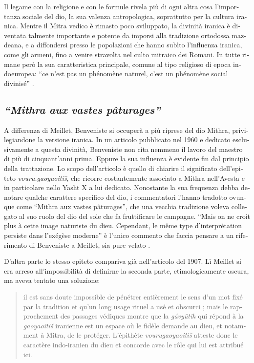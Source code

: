 \documentclass[french,output=paper,colorlinks,citecolor=brown]{../langscibook}
\begin{document}
\begin{otherlanguage}{italian}
Il legame con la religione e con le formule rivela più di ogni altra cosa l’importanza sociale del dio, la sua valenza antropologica, soprattutto per la cultura iranica. Mentre il Mitra vedico è rimasto poco sviluppato, la divinità iranica è diventata talmente importante e potente da imporsi alla tradizione ortodossa mazdeana, e a diffondersi presso le popolazioni che hanno subìto l’influenza iranica, come gli armeni, fino a venire stravolta nel culto mitraico dei Romani. In tutte rimane però la sua caratteristica principale, comune al tipo religioso di epoca indoeuropea: “ce n’est pas un phénomène naturel, c’est un phénomène social divinisé” \citep[159]{Meillet1907}.

\subsection{\textit{“Mithra} \textit{aux} \textit{vastes} \textit{pâturages”}}

A differenza di Meillet, Benveniste si occuperà a più riprese del dio Mithra, privilegiandone la versione iranica. In un articolo pubblicato nel 1960 e dedicato esclusivamente a questa divinità, Benveniste non cita nemmeno il lavoro del maestro di più di cinquant’anni prima. Eppure la sua influenza è evidente fin dal principio della trattazione. Lo scopo dell’articolo è quello di chiarire il significato dell’epiteto \textit{vouru.gaoyaoitiš}, che ricorre costantemente associato a Mithra nell’Avesta e in particolare nello Yasht X a lui dedicato. Nonostante la sua frequenza debba denotare qualche carattere specifico del dio, i commentatori l’hanno tradotto ovunque come “Mithra aux vastes pâturages”, che una vecchia tradizione voleva collegato al suo ruolo del dio del sole che fa fruttificare le campagne. “Mais on ne croit plus à cette image naturiste du dieu. Cependant, le même type d’interprétation persiste dans l’exégèse moderne” è l’unico commento che faccia pensare a un riferimento di Benveniste a Meillet, sia pure velato \citep[277]{Benveniste2015}.

D’altra parte lo stesso epiteto compariva già nell’articolo del 1907. Lì Meillet si era arreso all’impossibilità di definirne la seconda parte, etimologicamente oscura, ma aveva tentato una soluzione:

\begin{quote}
il est sans doute impossible de pénétrer entièrement le sens d’un mot fixé par la tradition et qu’un long usage rituel a usé et obscurci ; mais le rapprochement des passages védiques montre que la \textit{gávyūtih} qui répond à la \textit{gaoyaoitiš} iranienne est un espace où le fidèle demande au dieu, et notamment à Mitra, de le protéger. L’épithète \textit{vourugaoyaoitiš} atteste donc le caractère indo-iranien du dieu et concorde avec le rôle qui lui est attribué ici. \citep[156]{Meillet1907}
\end{quote}


\end{otherlanguage}
\end{document}
